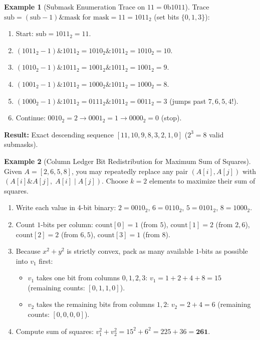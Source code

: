 \documentclass[11pt,a4paper]{article}
\theoremstyle{definition}
\newtheorem{example}{Example}[section]
\begin{document}
\begin{example}[Submask Enumeration Trace on \texorpdfstring{$11 = 0\text{b}1011$}{11 = 0b1011}]
Trace $\text{sub} = (\text{sub} - 1) \mathbin{\&} \text{mask}$ for $\text{mask} = 11 = 1011_2$ (set bits $\{0, 1, 3\}$):
\begin{enumerate}[itemsep=1pt]
    \item Start: $\text{sub} = 1011_2 = 11$.
    \item $(1011_2 - 1) \mathbin{\&} 1011_2 = 1010_2 \mathbin{\&} 1011_2 = 1010_2 = 10$.
    \item $(1010_2 - 1) \mathbin{\&} 1011_2 = 1001_2 \mathbin{\&} 1011_2 = 1001_2 = 9$.
    \item $(1001_2 - 1) \mathbin{\&} 1011_2 = 1000_2 \mathbin{\&} 1011_2 = 1000_2 = 8$.
    \item $(1000_2 - 1) \mathbin{\&} 1011_2 = 0111_2 \mathbin{\&} 1011_2 = 0011_2 = 3$ (jumps past $7, 6, 5, 4$!).
    \item Continue: $0010_2 = 2 \to 0001_2 = 1 \to 0000_2 = 0$ (stop).
\end{enumerate}
\textbf{Result:} Exact descending sequence $[11, 10, 9, 8, 3, 2, 1, 0]$ ($2^3 = 8$ valid submasks).
\end{example}

\begin{example}[Column Ledger Bit Redistribution for Maximum Sum of Squares]
Given $A = [2, 6, 5, 8]$, you may repeatedly replace any pair $(A[i], A[j])$ with $(A[i] \mathbin{\&} A[j],\; A[i] \mid A[j])$. Choose $k = 2$ elements to maximize their sum of squares.
\begin{enumerate}[itemsep=2pt]
    \item Write each value in 4-bit binary: $2 = 0010_2$, $6 = 0110_2$, $5 = 0101_2$, $8 = 1000_2$.
    \item Count $1$-bits per column: $\text{count}[0] = 1$ (from $5$), $\text{count}[1] = 2$ (from $2, 6$), $\text{count}[2] = 2$ (from $6, 5$), $\text{count}[3] = 1$ (from $8$).
    \item Because $x^2 + y^2$ is strictly convex, pack as many available $1$-bits as possible into $v_1$ first:
    \begin{itemize}[itemsep=1pt, topsep=1pt]
        \item $v_1$ takes one bit from columns $0, 1, 2, 3$: $v_1 = 1 + 2 + 4 + 8 = 15$ (remaining counts: $[0, 1, 1, 0]$).
        \item $v_2$ takes the remaining bits from columns $1, 2$: $v_2 = 2 + 4 = 6$ (remaining counts: $[0, 0, 0, 0]$).
    \end{itemize}
    \item Compute sum of squares: $v_1^2 + v_2^2 = 15^2 + 6^2 = 225 + 36 = \mathbf{261}$.
\end{enumerate}
\end{example}
\end{document}
